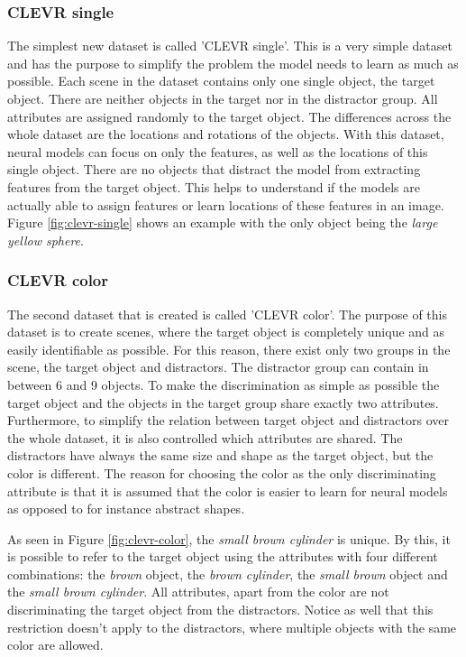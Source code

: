 \subsubsection*{CLEVR single}
The simplest new dataset is called 'CLEVR single'.
This is a very simple dataset and has the purpose to simplify the problem the model needs to learn as much as possible.
Each scene in the dataset contains only one single object, the target object.
There are neither objects in the target nor in the distractor group.
All attributes are assigned randomly to the target object.
The differences across the whole dataset are the locations and rotations of the objects.
With this dataset, neural models can focus on only the features, as well as the locations of this single object.
There are no objects that distract the model from extracting features from the target object.
This helps to understand if the models are actually able to assign features or learn locations of these features in an image.
Figure \ref{fig:clevr-single} shows an example with the only object being the \emph{large yellow sphere}.

\subsubsection*{CLEVR color}
The second dataset that is created is called 'CLEVR color'.
The purpose of this dataset is to create scenes, where the target object is completely unique and as easily identifiable as possible.
For this reason, there exist only two groups in the scene, the target object and distractors.
The distractor group can contain in between 6 and 9 objects.
To make the discrimination as simple as possible the target object and the objects in the target group share exactly two attributes.
Furthermore, to simplify the relation between target object and distractors over the whole dataset, it is also controlled which attributes are shared.
The distractors have always the same size and shape as the target object, but the color is different.
The reason for choosing the color as the only discriminating attribute is that it is assumed that the color is easier to learn for neural models as opposed to for instance abstract shapes.

As seen in Figure \ref{fig:clevr-color}, the \emph{small brown cylinder} is unique.
By this, it is possible to refer to the target object using the attributes with four different combinations: the \emph{brown} object, the \emph{brown cylinder}, the \emph{small brown} object and the \emph{small brown cylinder}.
All attributes, apart from the color are not discriminating the target object from the distractors.
Notice as well that this restriction doesn't apply to the distractors, where multiple objects with the same color are allowed.

